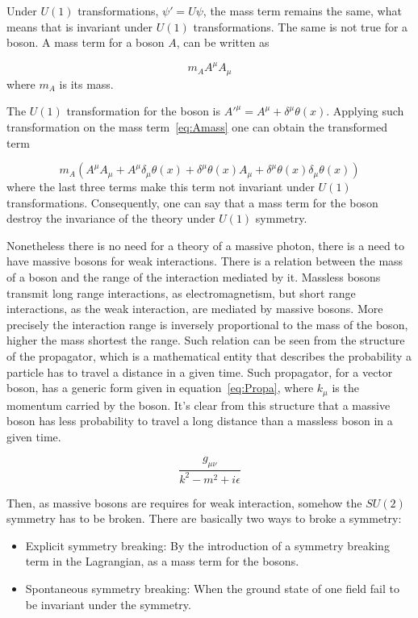 Under $U(1)$ transformations, $\psi'=U \psi$, the mass term remains the same, what means that is invariant under $U(1)$ transformations. The same is not true for a boson. A mass term for a boson $A$, can be written as 

\begin{equation}
  \label{eq:Amass}
  m_{A}A^{\mu}A_{\mu}
\end{equation} where $m_{A}$ is its mass.

The $U(1)$ transformation for the boson is $A'^{\mu}=A^{\mu}+\delta^{\mu}\theta(x)$. Applying such transformation on the mass term~\ref{eq:Amass} one can obtain the transformed term

\begin{equation}
  \label{eq:Amass}
  m_{A}\left(A^{\mu}A_{\mu}+A^{\mu}\delta_{\mu}\theta(x)+\delta^{\mu}\theta(x)A_{\mu}+\delta^{\mu}\theta(x)\delta_{\mu}\theta(x)\right)
\end{equation}where the last three terms make this term not invariant under $U(1)$ transformations. Consequently, one can say that a mass term for the boson destroy the invariance of the theory under $U(1)$ symmetry.

Nonetheless there is no need for a theory of a massive photon, there is a need to have massive bosons for weak interactions. There is a relation between the mass of a boson and the range of the interaction mediated by it. Massless bosons transmit long range interactions, as electromagnetism, but short range interactions, as the weak interaction, are mediated by massive bosons. More precisely the interaction range is inversely proportional to the mass of the boson, higher the mass shortest the range. Such relation can be seen from the structure of the propagator, which is a mathematical entity that describes the probability a particle has to travel a distance in a given time. Such propagator, for a vector boson, has a generic form given in equation~\ref{eq:Propa}, where $k_{\mu}$ is the momentum carried by the boson. It's clear from this structure that a massive boson has less probability to travel a long distance than a massless boson in a given time.

\begin{equation}
  \label{eq:Propa}
  \frac{g_{\mu\nu}}{k^{2}-m^{2}+i\epsilon}
\end{equation}

Then, as massive bosons are requires for weak interaction, somehow the $SU(2)$ symmetry has to be broken. There are basically two ways to broke a symmetry: 
\begin{itemize}
\item Explicit symmetry breaking: By the introduction of a symmetry breaking term in the Lagrangian, as a mass term for the bosons.
\item Spontaneous symmetry breaking: When the ground state of one field fail to be invariant under the symmetry. 
\end{itemize}

